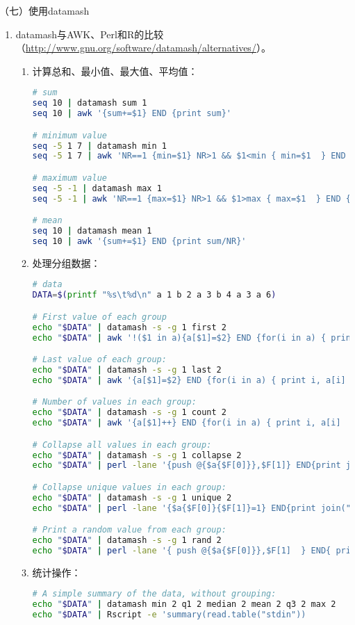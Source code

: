 \vspace{0.1in}
（七）使用datamash
\begin{enumerate}
  \item datamash与AWK、Perl和R的比较（\href{http://www.gnu.org/software/datamash/alternatives/}{http://www.gnu.org/software/datamash/alternatives/}）。
    \begin{enumerate}
      \item 计算总和、最小值、最大值、平均值：
\begin{lstlisting}[language=bash]
# sum
seq 10 | datamash sum 1
seq 10 | awk '{sum+=$1} END {print sum}'

# minimum value
seq -5 1 7 | datamash min 1
seq -5 1 7 | awk 'NR==1 {min=$1} NR>1 && $1<min { min=$1  } END {print min}'

# maximum value
seq -5 -1 | datamash max 1
seq -5 -1 | awk 'NR==1 {max=$1} NR>1 && $1>max { max=$1  } END {print max}'

# mean
seq 10 | datamash mean 1
seq 10 | awk '{sum+=$1} END {print sum/NR}'
\end{lstlisting}
      \item 处理分组数据：
\begin{lstlisting}[language=bash]
# data
DATA=$(printf "%s\t%d\n" a 1 b 2 a 3 b 4 a 3 a 6)

# First value of each group
echo "$DATA" | datamash -s -g 1 first 2
echo "$DATA" | awk '!($1 in a){a[$1]=$2} END {for(i in a) { print i, a[i] }}'

# Last value of each group:
echo "$DATA" | datamash -s -g 1 last 2
echo "$DATA" | awk '{a[$1]=$2} END {for(i in a) { print i, a[i]  }}'

# Number of values in each group:
echo "$DATA" | datamash -s -g 1 count 2
echo "$DATA" | awk '{a[$1]++} END {for(i in a) { print i, a[i]  }}'

# Collapse all values in each group:
echo "$DATA" | datamash -s -g 1 collapse 2
echo "$DATA" | perl -lane '{push @{$a{$F[0]}},$F[1]} END{print join("\n",map{"$_ ".join(",",@{$a{$_}})} sort keys %a);}'

# Collapse unique values in each group:
echo "$DATA" | datamash -s -g 1 unique 2
echo "$DATA" | perl -lane '{$a{$F[0]}{$F[1]}=1} END{print join("\n",map{"$_ ".join(",",sort keys %{$a{$_}})} sort keys %a);}'

# Print a random value from each group:
echo "$DATA" | datamash -s -g 1 rand 2
echo "$DATA" | perl -lane '{ push @{$a{$F[0]}},$F[1]  } END{ print join("\n",map{"$_ ".$a{$_}->[rand(@{$a{$_}})] } sort keys %a ) ; }'
\end{lstlisting}
      \item 统计操作：
\begin{lstlisting}[language=bash]
# A simple summary of the data, without grouping:
echo "$DATA" | datamash min 2 q1 2 median 2 mean 2 q3 2 max 2
echo "$DATA" | Rscript -e 'summary(read.table("stdin"))


\end{lstlisting}
\end{enumerate}
\end{enumerate}
